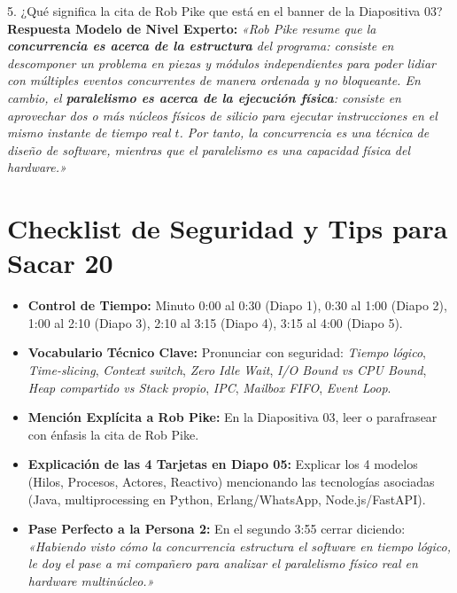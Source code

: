 \documentclass[11pt,a4paper]{article}
\begin{document}
\begin{qabox}{5. ¿Qué significa la cita de Rob Pike que está en el banner de la Diapositiva 03?}
\textbf{Respuesta Modelo de Nivel Experto:}  
\textit{«Rob Pike resume que la \textbf{concurrencia es acerca de la estructura} del programa: consiste en descomponer un problema en piezas y módulos independientes para poder lidiar con múltiples eventos concurrentes de manera ordenada y no bloqueante. En cambio, el \textbf{paralelismo es acerca de la ejecución física}: consiste en aprovechar dos o más núcleos físicos de silicio para ejecutar instrucciones en el mismo instante de tiempo real $t$. Por tanto, la concurrencia es una técnica de diseño de software, mientras que el paralelismo es una capacidad física del hardware.»}
\end{qabox}

\section{Checklist de Seguridad y Tips para Sacar 20}

\begin{itemize}[leftmargin=6mm]
    \item[$\square$] \textbf{Control de Tiempo:} Minuto 0:00 al 0:30 (Diapo 1), 0:30 al 1:00 (Diapo 2), 1:00 al 2:10 (Diapo 3), 2:10 al 3:15 (Diapo 4), 3:15 al 4:00 (Diapo 5).
    \item[$\square$] \textbf{Vocabulario Técnico Clave:} Pronunciar con seguridad: \textit{Tiempo lógico}, \textit{Time-slicing}, \textit{Context switch}, \textit{Zero Idle Wait}, \textit{I/O Bound vs CPU Bound}, \textit{Heap compartido vs Stack propio}, \textit{IPC}, \textit{Mailbox FIFO}, \textit{Event Loop}.
    \item[$\square$] \textbf{Mención Explícita a Rob Pike:} En la Diapositiva 03, leer o parafrasear con énfasis la cita de Rob Pike.
    \item[$\square$] \textbf{Explicación de las 4 Tarjetas en Diapo 05:} Explicar los 4 modelos (Hilos, Procesos, Actores, Reactivo) mencionando las tecnologías asociadas (Java, multiprocessing en Python, Erlang/WhatsApp, Node.js/FastAPI).
    \item[$\square$] \textbf{Pase Perfecto a la Persona 2:} En el segundo 3:55 cerrar diciendo: \textit{«Habiendo visto cómo la concurrencia estructura el software en tiempo lógico, le doy el pase a mi compañero para analizar el paralelismo físico real en hardware multinúcleo.»}
\end{itemize}
\end{document}
